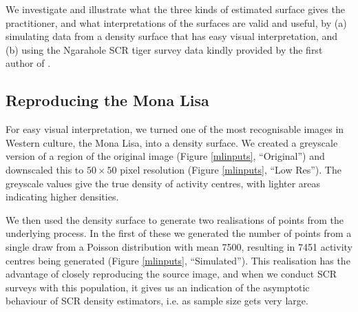 \documentclass[10pt,a4paper]{article}
\begin{document}
We investigate and illustrate what the three kinds of estimated surface gives the practitioner, and what interpretations of the surfaces are valid and useful, by (a) simulating data from a density surface that has easy visual interpretation, and (b) using the Ngarahole SCR tiger survey data kindly provided by the first author of \cite{Dorazio+Karanth:17}.

\subsection{Reproducing the Mona Lisa} \label{monalisa}

For easy visual interpretation, we turned one of the most recognisable images in Western culture, the Mona Lisa, into a density surface. We created a greyscale version of a region of the original image (Figure \ref{mlinputs}, ``Original'') and downscaled this to $50\times 50$ pixel resolution (Figure \ref{mlinputs}, ``Low Res'').  The greyscale values give the true density of activity centres, with lighter areas indicating higher densities. 

We then used the density surface  to generate two realisations of points from the underlying process. In the first of these we generated the number of points from a single draw from a Poisson distribution with mean 7500, resulting in 7451 activity centres being generated (Figure \ref{mlinputs}, ``Simulated''). This realisation has the advantage of closely reproducing the source image, and when we conduct SCR surveys with this population, it gives us an indication of the asymptotic behaviour of SCR density estimators, i.e. as sample size gets very large. %
\end{document}
